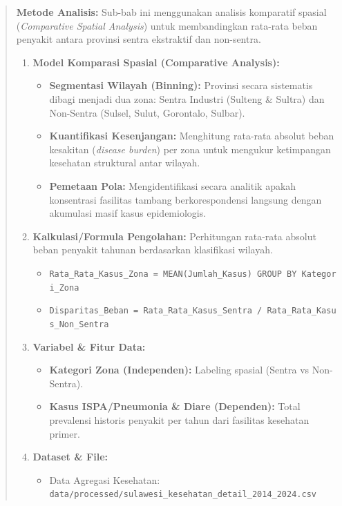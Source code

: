 \documentclass[
]{article}
\providecommand{\tightlist}{%
  \setlength{\itemsep}{0pt}\setlength{\parskip}{0pt}}
\begin{document}
\begin{quote}
\textbf{Metode Analisis:} Sub-bab ini menggunakan analisis komparatif
spasial (\emph{Comparative Spatial Analysis}) untuk membandingkan
rata-rata beban penyakit antara provinsi sentra ekstraktif dan
non-sentra.

\begin{enumerate}
\def\labelenumi{\arabic{enumi}.}
\tightlist
\item
  \textbf{Model Komparasi Spasial (Comparative Analysis):}

  \begin{itemize}
  \tightlist
  \item
    \textbf{Segmentasi Wilayah (Binning):} Provinsi secara sistematis
    dibagi menjadi dua zona: Sentra Industri (Sulteng \& Sultra) dan
    Non-Sentra (Sulsel, Sulut, Gorontalo, Sulbar).
  \item
    \textbf{Kuantifikasi Kesenjangan:} Menghitung rata-rata absolut
    beban kesakitan (\emph{disease burden}) per zona untuk mengukur
    ketimpangan kesehatan struktural antar wilayah.
  \item
    \textbf{Pemetaan Pola:} Mengidentifikasi secara analitik apakah
    konsentrasi fasilitas tambang berkorespondensi langsung dengan
    akumulasi masif kasus epidemiologis.
  \end{itemize}
\item
  \textbf{Kalkulasi/Formula Pengolahan:} Perhitungan rata-rata absolut
  beban penyakit tahunan berdasarkan klasifikasi wilayah.

  \begin{itemize}
  \tightlist
  \item
    \texttt{Rata\_Rata\_Kasus\_Zona\ =\ MEAN(Jumlah\_Kasus)\ GROUP\ BY\ Kategori\_Zona}
  \item
    \texttt{Disparitas\_Beban\ =\ Rata\_Rata\_Kasus\_Sentra\ /\ Rata\_Rata\_Kasus\_Non\_Sentra}
  \end{itemize}
\item
  \textbf{Variabel \& Fitur Data:}

  \begin{itemize}
  \tightlist
  \item
    \textbf{Kategori Zona (Independen):} Labeling spasial (Sentra vs
    Non-Sentra).
  \item
    \textbf{Kasus ISPA/Pneumonia \& Diare (Dependen):} Total prevalensi
    historis penyakit per tahun dari fasilitas kesehatan primer.
  \end{itemize}
\item
  \textbf{Dataset \& File:}

  \begin{itemize}
  \tightlist
  \item
    Data Agregasi Kesehatan:
    \texttt{data/processed/sulawesi\_kesehatan\_detail\_2014\_2024.csv}
  \end{itemize}
\end{enumerate}
\end{quote}
\end{document}
